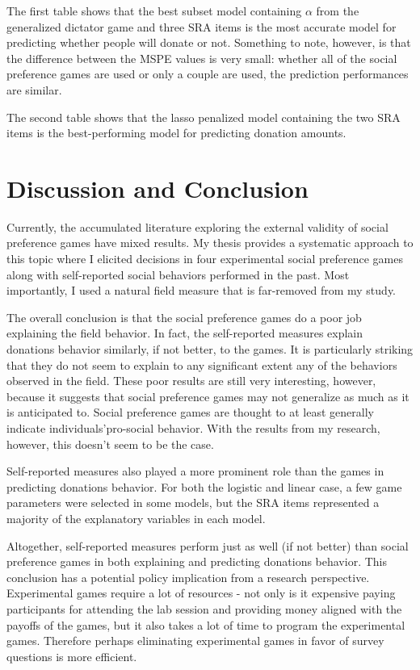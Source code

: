 \documentclass[12pt]{article}
\begin{document}
The first table shows that the best subset model containing \(\alpha\) from the generalized dictator game and three SRA items is the most accurate model for predicting whether people will donate or not. Something to note, however, is that the difference between the MSPE values is very small: whether all of the social preference games are used or only a couple are used, the prediction performances are similar.

The second table shows that the lasso penalized model containing the two SRA items is the best-performing model for predicting donation amounts.

\section{Discussion and Conclusion}

Currently, the accumulated literature exploring the external validity of social preference games have mixed results. My thesis provides a systematic approach to this topic where I elicited decisions in four experimental social preference games along with self-reported social behaviors performed in the past. Most importantly, I used a natural field measure that is far-removed from my study.

The overall conclusion is that the social preference games do a poor job explaining the field behavior. In fact, the self-reported measures explain donations behavior similarly, if not better, to the games. It is particularly striking that they do not seem to explain to any significant extent any of the behaviors observed in the field. These poor results are still very interesting, however, because it suggests that social preference games may not generalize as much as it is anticipated to. Social preference games are thought to at least generally indicate individuals\rq pro-social behavior. With the results from my research, however, this doesn\rq t seem to be the case. 

Self-reported measures also played a more prominent role than the games in predicting donations behavior. For both the logistic and linear case, a few game parameters were selected in some models, but the SRA items represented a majority of the explanatory variables in each model.

Altogether, self-reported measures perform just as well (if not better) than social preference games in both explaining and predicting donations behavior. This conclusion has a potential policy implication from a research perspective. Experimental games require a lot of resources - not only is it expensive paying participants for attending the lab session and providing money aligned with the payoffs of the games, but it also takes a lot of time to program the experimental games. Therefore perhaps eliminating experimental games in favor of survey questions is more efficient.
\end{document}
